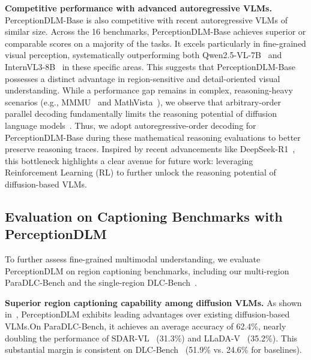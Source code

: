 \noindent
\textbf{Competitive performance with advanced autoregressive VLMs.}
PerceptionDLM-Base is also competitive with recent autoregressive VLMs of similar size. Across the 16 benchmarks, PerceptionDLM-Base achieves superior or comparable scores on a majority of the tasks. 
%
It excels particularly in fine-grained visual perception, systematically outperforming both Qwen2.5-VL-7B~\citep{bai2025qwen25vl} and InternVL3-8B~\citep{zhu2025internvl3} in these specific areas. 
%
This suggests that PerceptionDLM-Base possesses a distinct advantage in region-sensitive and detail-oriented visual understanding. While a performance gap remains in complex, reasoning-heavy scenarios (e.g., MMMU~\citep{yue2024mmmu} and MathVista~\citep{lu2023mathvista}), we observe that arbitrary-order parallel decoding fundamentally limits the reasoning potential of diffusion language models~\citep{ni2026flexibility}. Thus, we adopt autoregressive-order decoding for PerceptionDLM-Base during these mathematical reasoning evaluations to better preserve reasoning traces. Inspired by recent advancements like DeepSeek-R1~\citep{guo2025deepseek}, this bottleneck highlights a clear avenue for future work: leveraging Reinforcement Learning (RL) to further unlock the reasoning potential of diffusion-based VLMs.


\vspace{-2mm}
\subsection{Evaluation on Captioning Benchmarks with PerceptionDLM}
\vspace{-2mm}
To further assess fine-grained multimodal understanding, we evaluate PerceptionDLM on region captioning benchmarks, including our multi-region ParaDLC-Bench and the single-region DLC-Bench~\citep{lian2025describe}.

\noindent
\textbf{Superior region captioning capability among diffusion VLMs.}
As shown in~, PerceptionDLM exhibits leading advantages over existing diffusion-based VLMs.On ParaDLC-Bench, it achieves an average accuracy of 62.4\%, nearly doubling the performance of SDAR-VL~\citep{cheng2025sdar} (31.3\%) and LLaDA-V~\citep{you2025llada} (35.2\%). This substantial margin is consistent on DLC-Bench~\citep{lian2025describe} (51.9\% vs. 24.6\% for baselines). 

